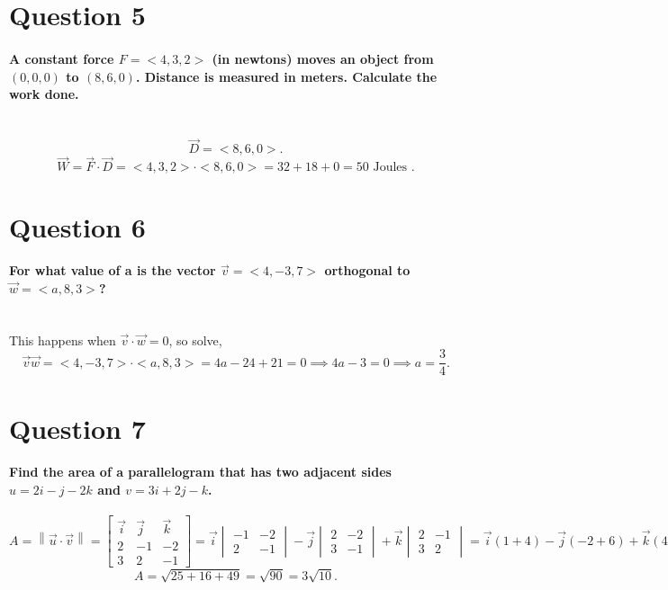 \documentclass{report}
\begin{document}
\section{Question 5}%
\label{sec: Question 5 }
\paragraph{A constant force $ F= < 4,3,2> $ (in newtons) moves an object from $ \left( 0,0,0 \right) $ to $ \left( 8,6,0 \right) $. Distance is measured in meters. Calculate the work done. \\ \\}

\[
\vec{ D } = < 8,6,0 >
.\] 
\[
\vec{ W } = \vec{ F } \cdot \vec{ D } = < 4,3,2 > \cdot < 8,6,0 > = 32 + 18 + 0 = 50 \text{ Joules }
.\] 
\section{Question 6}%
\label{sec: Question 6 }
\paragraph{For what value of a is the vector $ \vec{ v } = <4,-3,7> $ orthogonal to $ \vec{ w } = <a,8,3> $? \\ \\}
This happens when $ \vec{ v } \cdot \vec{ w } = 0 $, so solve,
\[
\vec{ v }\vec{ w } = <4,-3,7> \cdot <a,8,3> = 4a - 24 + 21 = 0 \implies 4a - 3 = 0 \implies a = \frac{ 3 }{ 4 }
.\] 
\section{Question 7}%
\label{sec: Question 7 }
\paragraph{Find the area of  a parallelogram that has two adjacent sides $ u=2i- j-2k $ and $ v=3i+2j-k $.}
\[
	A = \left\| \vec{ u } \cdot \vec{ v } \right\| = \begin{bmatrix} \vec{ i } & \vec{ j } & \vec{ k }\\ 2 & -1 & -2 \\ 3 & 2 & -1 \end{bmatrix} = \vec{ i } \begin{vmatrix} -1 & -2 \\ 2 & -1 \end{vmatrix} - \vec{ j } \begin{vmatrix} 2 & -2 \\ 3 & -1 \end{vmatrix} + \vec{ k } \begin{vmatrix} 2 & -1 \\ 3 & 2 \end{vmatrix} = \vec{ i } (1+4) - \vec{ j } (-2+6) + \vec{ k } (4+3) = \left\| < -5,4,7 > \right\|
.\] 
\[
A = \sqrt{ 25 + 16 + 49 } = \sqrt{ 90 } = 3\sqrt{ 10 }
.\] 
\end{document}
